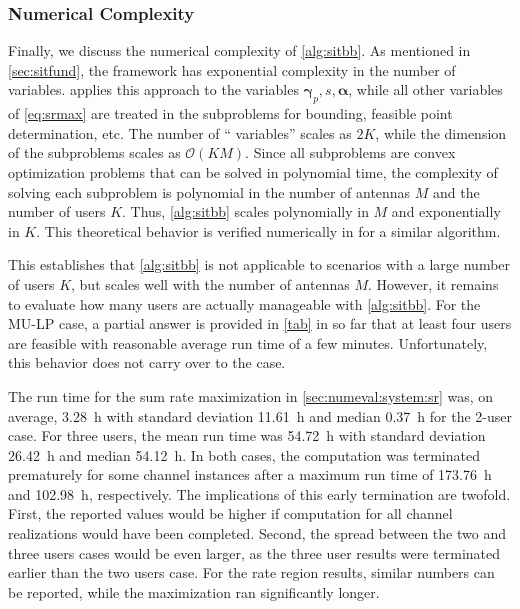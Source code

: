 \documentclass[a4paper,10pt,journal]{IEEEtran}
\let\vec\bm
\begin{document}
\subsubsection{Numerical Complexity}
Finally, we discuss the numerical complexity of \cref{alg:sitbb}. As mentioned in \cref{sec:sitfund}, the  framework has exponential complexity in the number of variables.  applies this  approach to the variables $\vec \gamma_p, s, \vec\alpha$, while all other variables of \cref{eq:srmax} are treated in the subproblems for bounding, feasible point determination, etc. The number of `` variables'' scales as $2 K$, while the dimension of the subproblems scales as $\mathcal O(K M)$. Since all subproblems are convex optimization problems that can be solved in polynomial time, the complexity of solving each subproblem is polynomial in the number of antennas $M$ and the number of users $K$. Thus, \cref{alg:sitbb} scales polynomially in $M$ and exponentially in $K$. This theoretical behavior is verified numerically in \cite{sit} for a similar algorithm.

This establishes that \cref{alg:sitbb} is not applicable to scenarios with a large number of users $K$, but scales well with the number of antennas $M$. However, it remains to evaluate how many users are actually manageable with \cref{alg:sitbb}. For the MU-LP case, a partial answer is provided in \cref{tab} in so far that at least four users are feasible with reasonable average run time of a few minutes. Unfortunately, this behavior does not carry over to the  case.

The run time for the sum rate maximization in \cref{sec:numeval:system:sr} was, on average, \SI{3.28}{\hour} with standard deviation \SI{11.61}{\hour} and median \SI{0.37}{\hour} for the 2-user case. For three users, the mean run time was \SI{54.72}{\hour} with standard deviation \SI{26.42}{\hour} and median \SI{54.12}{\hour}. In both cases, the computation was terminated prematurely for some channel instances after a maximum run time of \SI{173.76}{\hour} and \SI{102.98}{\hour}, respectively.
The implications of this early termination are twofold. First, the reported values would be higher if computation for all channel realizations would have been completed. Second, the spread between the two and three users cases would be even larger, as the three user results were terminated earlier than the two users case.
For the rate region results, similar numbers can be reported, while the  maximization ran significantly longer.
\end{document}
